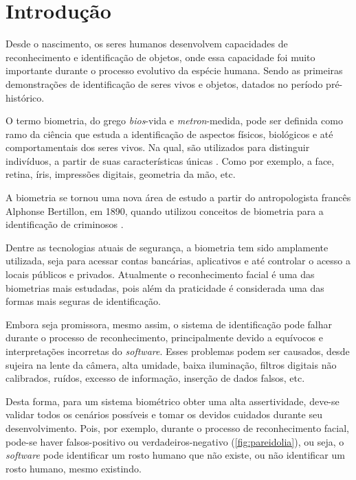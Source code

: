 
\chapter{Introdução}\label{cap:introducao}

Desde o nascimento, os seres humanos desenvolvem capacidades de reconhecimento e 
identificação de objetos, onde essa capacidade foi muito 
importante durante o processo evolutivo da espécie humana. Sendo as primeiras 
demonstrações de identificação de seres vivos e objetos, datados no período 
pré-histórico.

O termo biometria, do grego \textit{bios}-vida e \textit{metron}-medida, pode ser 
definida como ramo da ciência que estuda a identificação de aspectos físicos, biológicos e até 
comportamentais dos seres vivos. Na qual, são utilizados para distinguir indivíduos, 
a partir de suas características únicas \cite{ferreira2009}. Como por exemplo, a face, retina, 
íris, impressões digitais, geometria da mão, etc.

A biometria se tornou uma nova área de estudo a partir do antropologista francês
Alphonse Bertillon, em 1890, quando utilizou conceitos de biometria para a 
identificação de criminosos \cite{moraes2006}. 

Dentre as tecnologias atuais de segurança, a biometria tem sido amplamente 
utilizada, seja para acessar contas bancárias, aplicativos e até controlar 
o acesso a locais públicos e privados. Atualmente o reconhecimento facial 
é uma das biometrias mais estudadas, pois além da praticidade é considerada uma 
das formas mais seguras de identificação. 

Embora seja promissora, mesmo assim, o sistema de identificação pode falhar durante o 
processo de reconhecimento, principalmente devido a equívocos e interpretações 
incorretas do \textit{software}. Esses problemas podem ser causados,
desde sujeira na lente da câmera, alta umidade, baixa iluminação, filtros digitais 
não calibrados, ruídos, excesso de informação, inserção de dados falsos, etc.

Desta forma, para um sistema biométrico obter uma alta assertividade, 
deve-se validar todos os cenários possíveis e tomar os devidos cuidados durante seu 
desenvolvimento. Pois, por exemplo, durante o processo de reconhecimento facial,
pode-se haver falsos-positivo ou verdadeiros-negativo (\autoref{fig:pareidolia}), 
ou seja, o \textit{software} pode identificar um rosto humano que não existe, 
ou não identificar um rosto humano, mesmo existindo.

